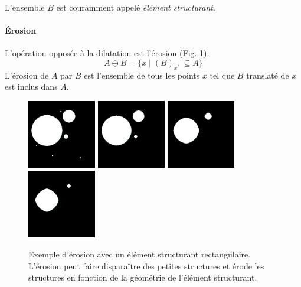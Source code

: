   L'ensemble $B$ est couramment appelé \emph{élément structurant}. 
  
  \paragraph{Érosion}
  L'opération opposée à la dilatation est l'érosion (Fig. \ref{fig:morpho_erosion}).
  \begin{equation}
    A \ominus B = \{x \mid (B)_x, \subseteq A\}
  \end{equation}
  L'érosion de $A$ par $B$ est l'ensemble de tous les points $x$ tel que $B$ translaté de $x$ est inclus dans $A$. 
  
  \begin{figure}[h]
    \centering
    \includegraphics[height=3cm]{Images/morpho_init.png}
    \includegraphics[height=3cm]{Images/morpho_erode_k5.png}
    \includegraphics[height=3cm]{Images/morpho_erode_k21.png}
    \includegraphics[height=3cm]{Images/morpho_erode_k31.png}
    \caption{Exemple d'érosion avec un élément structurant rectangulaire. L'érosion peut faire disparaître des petites structures et érode les structures en fonction de la géométrie de l'élément structurant.}
    \label{fig:morpho_erosion}
  \end{figure}
  
